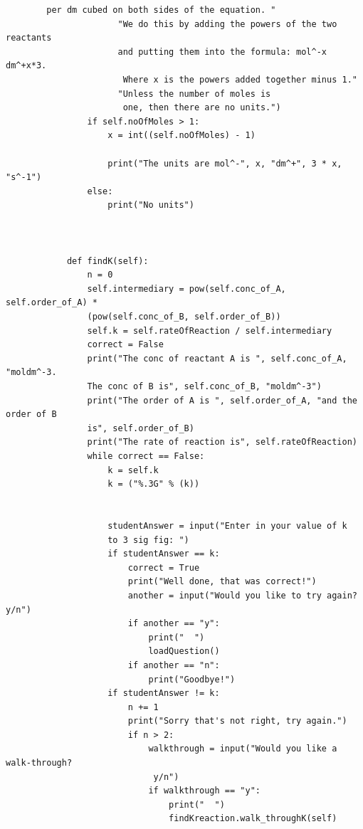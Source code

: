 \documentclass[a4paper,12pt]{report}
\begin{document}
\begin{verbatim}
        per dm cubed on both sides of the equation. "
                      "We do this by adding the powers of the two reactants 
                      and putting them into the formula: mol^-x dm^+x*3.
                       Where x is the powers added together minus 1."
                      "Unless the number of moles is
                       one, then there are no units.")
                if self.noOfMoles > 1:
                    x = int((self.noOfMoles) - 1)
        
                    print("The units are mol^-", x, "dm^+", 3 * x, "s^-1")
                else:
                    print("No units")        
                
        
        
            def findK(self):
                n = 0
                self.intermediary = pow(self.conc_of_A, self.order_of_A) *
                (pow(self.conc_of_B, self.order_of_B))
                self.k = self.rateOfReaction / self.intermediary
                correct = False
                print("The conc of reactant A is ", self.conc_of_A, "moldm^-3.
                The conc of B is", self.conc_of_B, "moldm^-3")
                print("The order of A is ", self.order_of_A, "and the order of B
                is", self.order_of_B)
                print("The rate of reaction is", self.rateOfReaction)
                while correct == False:
                    k = self.k
                    k = ("%.3G" % (k))
                    
        
                    studentAnswer = input("Enter in your value of k
                    to 3 sig fig: ")
                    if studentAnswer == k:
                        correct = True
                        print("Well done, that was correct!")
                        another = input("Would you like to try again? y/n")
                        if another == "y":
                            print("  ")
                            loadQuestion()
                        if another == "n":
                            print("Goodbye!")
                    if studentAnswer != k:
                        n += 1
                        print("Sorry that's not right, try again.")
                        if n > 2:
                            walkthrough = input("Would you like a walk-through? 
                           	 y/n")
                            if walkthrough == "y":
                                print("  ")
                                findKreaction.walk_throughK(self)
                        

\end{verbatim}
\end{document}

